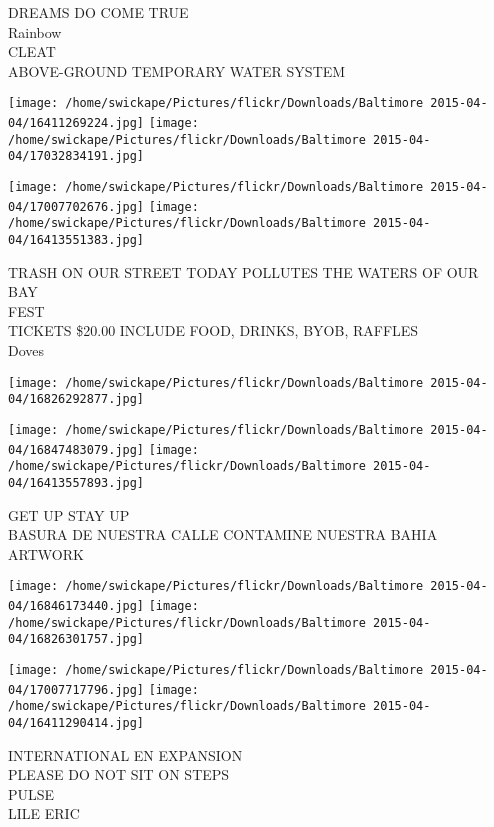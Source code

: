\documentclass[10pt,letterpaper]{article}
\begin{document}
DREAMS DO COME TRUE\\
Rainbow\\
CLEAT\\
ABOVE{-}GROUND TEMPORARY WATER SYSTEM\\
\pagebreak

\texttt{[image: /home/swickape/Pictures/flickr/Downloads/Baltimore 2015-04-04/16411269224.jpg]}
\texttt{[image: /home/swickape/Pictures/flickr/Downloads/Baltimore 2015-04-04/17032834191.jpg]}

\texttt{[image: /home/swickape/Pictures/flickr/Downloads/Baltimore 2015-04-04/17007702676.jpg]}
\texttt{[image: /home/swickape/Pictures/flickr/Downloads/Baltimore 2015-04-04/16413551383.jpg]}

TRASH ON OUR STREET TODAY POLLUTES THE WATERS OF OUR BAY\\
FEST\\
TICKETS \$20.00 INCLUDE FOOD, DRINKS, BYOB, RAFFLES\\
Doves\\
\pagebreak

\texttt{[image: /home/swickape/Pictures/flickr/Downloads/Baltimore 2015-04-04/16826292877.jpg]}

\vspace{0.25in}
\texttt{[image: /home/swickape/Pictures/flickr/Downloads/Baltimore 2015-04-04/16847483079.jpg]}
\texttt{[image: /home/swickape/Pictures/flickr/Downloads/Baltimore 2015-04-04/16413557893.jpg]}

GET UP STAY UP\\
BASURA DE NUESTRA CALLE CONTAMINE NUESTRA BAHIA\\
ARTWORK\\
\pagebreak

\texttt{[image: /home/swickape/Pictures/flickr/Downloads/Baltimore 2015-04-04/16846173440.jpg]}
\texttt{[image: /home/swickape/Pictures/flickr/Downloads/Baltimore 2015-04-04/16826301757.jpg]}

\texttt{[image: /home/swickape/Pictures/flickr/Downloads/Baltimore 2015-04-04/17007717796.jpg]}
\texttt{[image: /home/swickape/Pictures/flickr/Downloads/Baltimore 2015-04-04/16411290414.jpg]}

INTERNATIONAL EN EXPANSION\\
PLEASE DO NOT SIT ON STEPS\\
PULSE\\
LILE ERIC\\
\pagebreak
\end{document}
